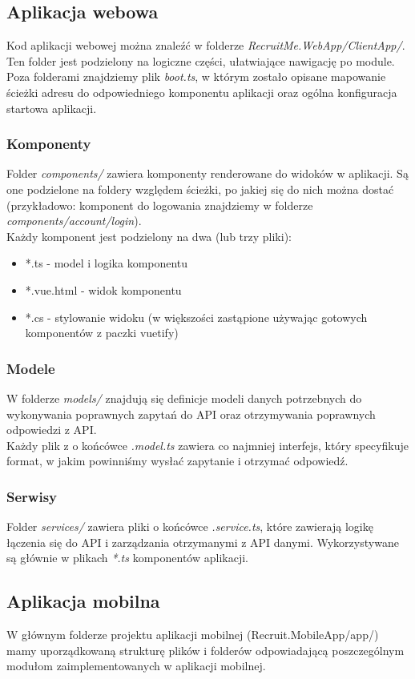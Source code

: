 \documentclass{article}
\begin{document}
\subsection{Aplikacja webowa}
Kod aplikacji webowej można znaleźć w folderze \emph{RecruitMe.WebApp/ClientApp/}. Ten folder jest podzielony na logiczne części, ułatwiające nawigację po module. Poza folderami znajdziemy plik \emph{boot.ts}, w którym zostało opisane mapowanie ścieżki adresu do odpowiedniego komponentu aplikacji oraz ogólna konfiguracja startowa aplikacji.
\subsubsection{Komponenty}
Folder \emph{components/} zawiera komponenty renderowane do widoków w aplikacji. Są one podzielone na foldery względem ścieżki, po jakiej się do nich można dostać (przykładowo: komponent do logowania znajdziemy w folderze \emph{components/account/login}). \\
Każdy komponent jest podzielony na dwa (lub trzy pliki): 
\begin{itemize}
    \item *.ts - model i logika komponentu
    \item *.vue.html - widok komponentu
    \item *.cs - stylowanie widoku (w większości zastąpione używając gotowych komponentów z paczki vuetify)
\end{itemize}
\subsubsection{Modele}
W folderze \emph{models/} znajdują się definicje modeli danych potrzebnych do wykonywania poprawnych zapytań do API oraz otrzymywania poprawnych odpowiedzi z API. \\
Każdy plik z o końcówce \emph{.model.ts} zawiera co najmniej interfejs, który specyfikuje format, w jakim powinniśmy wysłać zapytanie i otrzymać odpowiedź.
\subsubsection{Serwisy}
Folder \emph{services/} zawiera pliki o końcówce \emph{.service.ts}, które zawierają logikę łączenia się do API i zarządzania otrzymanymi z API danymi. Wykorzystywane są głównie w plikach \emph{*.ts} komponentów aplikacji.

\subsection{Aplikacja mobilna}
W głównym folderze projektu aplikacji mobilnej (Recruit.MobileApp/app/) mamy uporządkowaną strukturę plików i folderów odpowiadającą poszczególnym modułom zaimplementowanych w aplikacji mobilnej.
\end{document}
